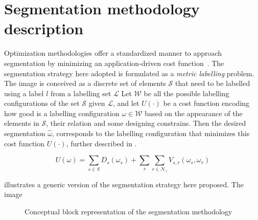 \graphicspath{ {./content/method/figures/} }

\section{Segmentation methodology description} 

Optimization methodologies offer a standardized manner to approach segmentation by minimizing an application-driven cost function~\cite{cremers2007review}.
The segmentation strategy here adopted is formulated as a \emph{metric labelling} problem. 
The image is conceived as a discrete set of elements $\mathcal{S}$ that need to be labelled using a label $l$ from a labelling set $\mathcal{L}$ %
Let $\mathcal{W}$ be all the possible labelling configurations of the set $\mathcal{S}$ given $\mathcal{L}$, and let $U(\cdot)$ be a cost function encoding how good is a labelling configuration $\omega \in \mathcal{W}$ based on the appearance of the elements in $\mathcal{S}$, their relation and some designing constrains.
Then the desired segmentation $\hat{\omega}$, corresponds to the labelling configuration that minimizes this cost function $U(\cdot)$, further described in .

\begin{equation}
  U(\omega) = \sum_{s\in S} D_s(\omega_s) + \sum_{s}\sum_{r \in \mathcal{N}_{s}} V_{s,r}(\omega_s,\omega_r)
  \label{eq:labelingEq}
\end{equation} 


 illustrates a generic version of the segmentation strategy here proposed. The image 
%
%
%
%
\begin{figure}[htpb]
  \centering
  \caption{Conceptual block representation of the segmentation methodology}
  \label{fig:method}
\end{figure}

